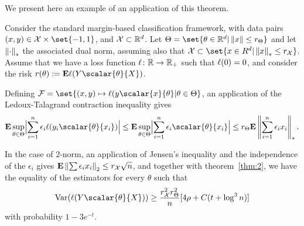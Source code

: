 We present here an example of an application of this theorem.
\begin{example}
    Consider the standard margin-based classification framework, with data pairs $(x,y) \in \mathcal{X} \times \set{-1, 1}$, and $\mathcal{X} \subset \mathbb{R}^d$. Let $\Theta = \set{\theta \in \R^d | \norm{x} \leq r_{\Theta}}$ and let $\left\lVert\cdot\right\rVert_\ast$ the associated dual norm, assuming also that $\mathcal{X} \subset \set{x \in R^d | \norm{x}_\ast \leq r_{\mathcal{X}}}$. Assume that we have a loss function $\ell \colon \mathbb{R} \to \mathbb{R}_+$ such that $\ell(0) = 0$, and consider the risk $\risk := \E \loss(Y\scalar{\theta}{X})$.

    Defining $\mathcal{F} = \set{(x,y) \mapsto \loss(y \scalar{x}{\theta} | \theta \in \Theta}$, an application of the Ledoux-Talagrand contraction inequality gives
    \[
    \E \sup_{\theta \in \Theta} \abs[\Big]{\sum_{i=1}^n \epsilon_i\loss(y_i\scalar{\theta}{x_i})}
    \leq \E \sup_{\theta \in \Theta} \abs[\Big]{\sum_{i=1}^n \epsilon_i \scalar{\theta}{x_i}}
    \leq r_{\Theta} \E\norm{\sum_{i=1}^n \epsilon_i x_i}_\ast.
    \]

    In the case of $2$-norm, an application of Jensen's inequality and the independence of the $\epsilon_i$ gives $\E \enorm{\sum \epsilon_i x_i} \leq r_{\mathcal{X}} \sqrt{n}$, and together with theorem~\ref{thm:2}, we have the equality of the estimators for every $\theta$ such that
    \[
        \Var(\loss(Y\scalar{\theta}{X})) \geq \frac{r_{\mathcal{X}}^2 r_{\Theta}^2}{n}\cor{4\rho + C\pa{t + \log^3 n}}
    \]
    with probability $1-3e^{-t}$.
\end{example}
